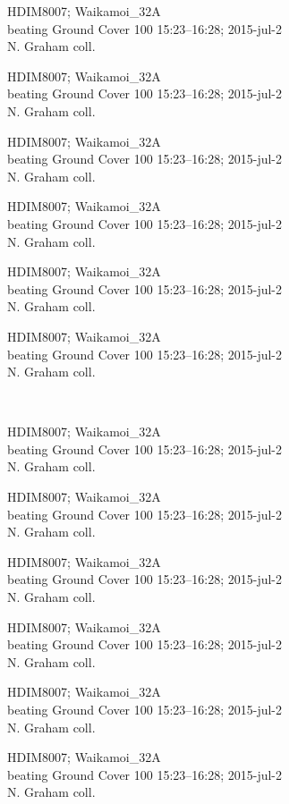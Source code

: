 \documentclass[2pt]{extarticle}
\begin{document}
\noindent
\raggedright
\parbox{0.16\textwidth}{\tiny \raggedright \rule[-0.3\baselineskip]{0pt}{10pt}HDIM8007; Waikamoi\_32A\\ beating Ground Cover 100 15:23--16:28; 2015-jul-2\\ N. Graham coll.}
\parbox{0.16\textwidth}{\tiny \raggedright \rule[-0.3\baselineskip]{0pt}{10pt}HDIM8007; Waikamoi\_32A\\ beating Ground Cover 100 15:23--16:28; 2015-jul-2\\ N. Graham coll.}
\parbox{0.16\textwidth}{\tiny \raggedright \rule[-0.3\baselineskip]{0pt}{10pt}HDIM8007; Waikamoi\_32A\\ beating Ground Cover 100 15:23--16:28; 2015-jul-2\\ N. Graham coll.}
\parbox{0.16\textwidth}{\tiny \raggedright \rule[-0.3\baselineskip]{0pt}{10pt}HDIM8007; Waikamoi\_32A\\ beating Ground Cover 100 15:23--16:28; 2015-jul-2\\ N. Graham coll.}
\parbox{0.16\textwidth}{\tiny \raggedright \rule[-0.3\baselineskip]{0pt}{10pt}HDIM8007; Waikamoi\_32A\\ beating Ground Cover 100 15:23--16:28; 2015-jul-2\\ N. Graham coll.}
\parbox{0.16\textwidth}{\tiny \raggedright \rule[-0.3\baselineskip]{0pt}{10pt}HDIM8007; Waikamoi\_32A\\ beating Ground Cover 100 15:23--16:28; 2015-jul-2\\ N. Graham coll.} \\ 
\vspace{0.001in} 

\noindent
\parbox{0.16\textwidth}{\tiny \raggedright \rule[-0.3\baselineskip]{0pt}{10pt}HDIM8007; Waikamoi\_32A\\ beating Ground Cover 100 15:23--16:28; 2015-jul-2\\ N. Graham coll.}
\parbox{0.16\textwidth}{\tiny \raggedright \rule[-0.3\baselineskip]{0pt}{10pt}HDIM8007; Waikamoi\_32A\\ beating Ground Cover 100 15:23--16:28; 2015-jul-2\\ N. Graham coll.}
\parbox{0.16\textwidth}{\tiny \raggedright \rule[-0.3\baselineskip]{0pt}{10pt}HDIM8007; Waikamoi\_32A\\ beating Ground Cover 100 15:23--16:28; 2015-jul-2\\ N. Graham coll.}
\parbox{0.16\textwidth}{\tiny \raggedright \rule[-0.3\baselineskip]{0pt}{10pt}HDIM8007; Waikamoi\_32A\\ beating Ground Cover 100 15:23--16:28; 2015-jul-2\\ N. Graham coll.}
\parbox{0.16\textwidth}{\tiny \raggedright \rule[-0.3\baselineskip]{0pt}{10pt}HDIM8007; Waikamoi\_32A\\ beating Ground Cover 100 15:23--16:28; 2015-jul-2\\ N. Graham coll.}
\parbox{0.16\textwidth}{\tiny \raggedright \rule[-0.3\baselineskip]{0pt}{10pt}HDIM8007; Waikamoi\_32A\\ beating Ground Cover 100 15:23--16:28; 2015-jul-2\\ N. Graham coll.} \\ 
\vspace{0.001in} 
\end{document}
